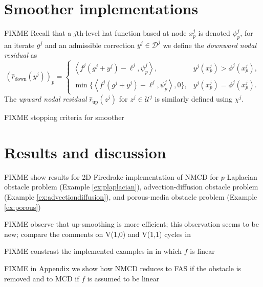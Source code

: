 \documentclass[letterpaper,final,12pt,reqno]{amsart}
\theoremstyle{cstyle}
\theoremstyle{cstyle*}
\theoremstyle{dstyle}
\numberwithin{equation}{section}
\numberwithin{figure}{section}
\numberwithin{table}{section}
\numberwithin{theorem}{section}
\newcommand{\ip}[2]{\left<#1,#2\right>}
\begin{document}
\section{Smoother implementations} \label{sec:smoothers}

FIXME  Recall that a $j$th-level hat function based at node $x_p^j$ is denoted $\psi_p^j$, for an iterate $g^j$ and an admissible correction $y^j \in \mathcal{D}^j$ we define the \emph{downward nodal residual} as
\begin{equation}
(\hat r_{\text{down}}(y^j))_p = \begin{cases} \ip{f^j(g^j+y^j)-\ell^j}{\psi_p^j}, & y^j(x_p^j) > \phi^j(x_p^j), \\
                                  \min\{\ip{f^j(g^j+y^j)-\ell^j}{\psi_p^j},0\}, & y^j(x_p^j) = \phi^j(x_p^j). \end{cases} \label{eq:dncpresidual}
\end{equation}
The \emph{upward nodal residual} $\hat r_{\text{up}}(z^j)$ for $z^j \in \mathcal{U}^j$ is similarly defined using $\chi^j$.

FIXME stopping criteria for smoother


\section{Results and discussion} \label{sec:results}

FIXME show results for 2D Firedrake implementation of NMCD for $p$-Laplacian obstacle problem (Example \ref{ex:plaplacian}), advection-diffusion obstacle problem (Example \ref{ex:advectiondiffusion}), and porous-media obstacle problem (Example \ref{ex:porous})

FIXME observe that up-smoothing is more efficient; this observation seems to be new; compare the comments on V(1,0) and V(1,1) cycles in \cite{GraeserKornhuber2009,Tai2003}

FIXME constrast the implemented examples in \cite{GraeserKornhuber2009,Tai2003} in which $f$ is linear

FIXME in Appendix we show how NMCD reduces to FAS if the obstacle is removed and to MCD if $f$ is assumed to be linear





\end{document}

